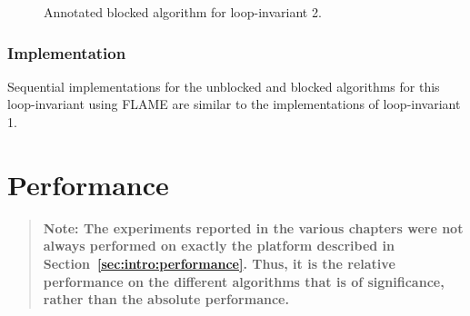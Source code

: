 \renewcommand{\afterupdate}{
\FlaThreeByThreeTL{ C_{00} }        { C_{01} }         { C_{02} }
                  { \undetermined } { C_{11}}          { C_{12} }
                  { \undetermined } { \undetermined }  { C_{22} }
=
\FlaTwoByTwo{
              \FlaTwoByTwoSingleLine { A_0 A_0^T + \hat{C}_{00}} { A_0 A_1^T + \hat{C}_{01}}
                                     {\undetermined} { A_1 A_1^T + \hat{C}_{11}}
            }
            {
              \FlaTwoByOneSingleLine{ A_0 A_2^T + \hat{C}_{02} }{ A_1 A_2 + \hat{C}_{12} }
            }
            { \undetermined }
            { \hat{C}_{22} }
\wedge \ldots
}

\renewcommand{\update}{
\begin{minipage}[t]{4in}
\noindent
$ C_{11} \becomes A_1 A_1^T + C_{11} $\\
$ C_{12} \becomes A_1 A_2^T + C_{12} $\\
\end{minipage}
}

\begin{figure}[htbp]
\worksheet
\caption{Annotated blocked algorithm for loop-invariant 2.}
\label{fig:ws:usyrk_unn:var2:blk}
\end{figure}
%

\subsubsection{Implementation}
 
Sequential implementations for the unblocked and blocked algorithms
for this loop-invariant using FLAME are similar to the implementations of loop-invariant 1.

\section{Performance}

\begin{quote}
{\bf Note:  The experiments reported in the various chapters
were not always performed on exactly the platform described in 
Section~\ref{sec:intro:performance}.  Thus, it is the
relative performance on the different algorithms that
is of significance, rather than the absolute performance.
}
\end{quote}

